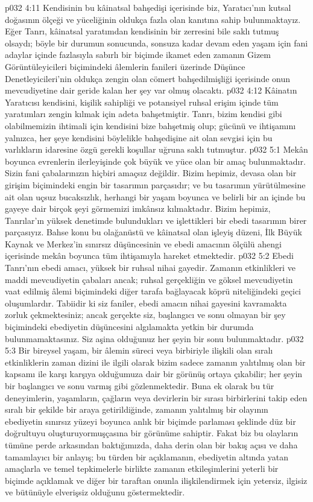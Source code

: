 \vs p032 4:11 Kendisinin bu kâinatsal bahşedişi içerisinde biz, Yaratıcı’nın kutsal doğasının ölçeği ve yüceliğinin oldukça fazla olan kanıtına sahip bulunmaktayız. Eğer Tanrı, kâinatsal yaratımdan kendisinin bir zerresini bile saklı tutmuş olsaydı; böyle bir durumun sonucunda, sonsuza kadar devam eden yaşam için fani adaylar içinde fazlasıyla sabırlı bir biçimde ikamet eden zamanın Gizem Görüntüleyicileri biçimindeki âlemlerin fanileri üzerinde Düşünce Denetleyicileri’nin oldukça zengin olan cömert bahşedilmişliği içerisinde onun mevcudiyetine dair geride kalan her şey var olmuş olacaktı.
\vs p032 4:12 Kâinatın Yaratıcısı kendisini, kişilik sahipliği ve potansiyel ruhsal erişim içinde tüm yaratımları zengin kılmak için adeta bahşetmiştir. Tanrı, bizim kendisi gibi olabilmemizin ihtimali için kendisini bize bahşetmiş olup; gücünü ve ihtişamını yalnızca, her şeye kendisini böylelikle bahşedişine ait olan sevgisi için bu varlıkların idaresine özgü gerekli koşullar uğruna saklı tutmuştur.
\vs p032 5:1 Mekân boyunca evrenlerin ilerleyişinde çok büyük ve yüce olan bir amaç bulunmaktadır. Sizin fani çabalarınızın hiçbiri amaçsız değildir. Bizim hepimiz, devasa olan bir girişim biçimindeki engin bir tasarımın parçasıdır; ve bu tasarımın yürütülmesine ait olan uçsuz bucaksızlık, herhangi bir yaşam boyunca ve belirli bir an içinde bu gayeye dair birçok şeyi görmemizi imkânsız kılmaktadır. Bizim hepimiz, Tanrılar’ın yüksek denetimde bulundukları ve işlettikleri bir ebedi tasarımın birer parçasıyız. Bahse konu bu olağanüstü ve kâinatsal olan işleyiş düzeni, İlk Büyük Kaynak ve Merkez’in sınırsız düşüncesinin ve ebedi amacının ölçülü ahengi içerisinde mekân boyunca tüm ihtişamıyla hareket etmektedir.
\vs p032 5:2 Ebedi Tanrı’nın ebedi amacı, yüksek bir ruhsal nihai gayedir. Zamanın etkinlikleri ve maddi mevcudiyetin çabaları ancak; ruhsal gerçekliğin ve göksel mevcudiyetin vaat edilmiş âlemi biçimindeki diğer tarafa bağlayacak köprü niteliğindeki geçici oluşumlardır. Tabiidir ki siz faniler, ebedi amacın nihai gayesini kavramakta zorluk çekmektesiniz; ancak gerçekte siz, başlangıcı ve sonu olmayan bir şey biçimindeki ebediyetin düşüncesini algılamakta yetkin bir durumda bulunmamaktasınız. Siz aşina olduğunuz her şeyin bir sonu bulunmaktadır.
\vs p032 5:3 Bir bireysel yaşam, bir âlemin süreci veya birbiriyle ilişkili olan sıralı etkinliklerin zaman dizini ile ilgili olarak bizim sadece zamanın yalıtılmış olan bir kapsamı ile karşı karşıya olduğumuza dair bir görünüş ortaya çıkabilir; her şeyin bir başlangıcı ve sonu varmış gibi gözlenmektedir. Buna ek olarak bu tür deneyimlerin, yaşamların, çağların veya devirlerin bir sırası birbirlerini takip eden sıralı bir şekilde bir araya getirildiğinde, zamanın yalıtılmış bir olayının ebediyetin sınırsız yüzeyi boyunca anlık bir biçimde parlaması şeklinde düz bir doğrultuyu oluşturuyormuşçasına bir görünüme sahiptir. Fakat biz bu olayların tümüne perde arkasından baktığımızda, daha derin olan bir bakış açısı ve daha tamamlayıcı bir anlayış; bu türden bir açıklamanın, ebediyetin altında yatan amaçlarla ve temel tepkimelerle birlikte zamanın etkileşimlerini yeterli bir biçimde açıklamak ve diğer bir taraftan onunla ilişkilendirmek için yetersiz, ilgisiz ve bütünüyle elverişsiz olduğunu göstermektedir.
